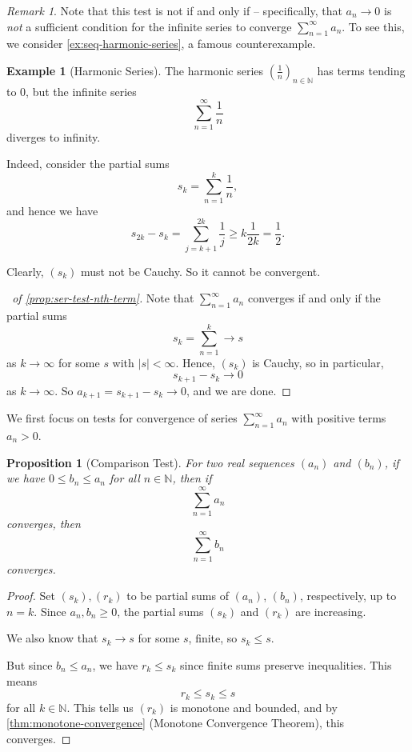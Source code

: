 \documentclass[11pt]{article}
\numberwithin{equation}{section}
\newtheorem{proposition}[theorem]{Proposition}
\theoremstyle{definition}
\newtheorem{example}[theorem]{Example}
\theoremstyle{remark}
\newtheorem{remark}[theorem]{Remark}
\newcommand{\pqty}[1]{\left(#1\right)}
\newcommand{\abs}[1]{\left|#1\right|}
\newcommand{\NN}{\mathbb N}
\begin{document}
\begin{remark}\label{analysis-unit-0036}
    Note that this test is not if and only if -- specifically, that \(a_n \to 0\) is \emph{not} a sufficient condition for the infinite series to converge \(\sum_{n = 1}^{\infty} a_n\). To see this, we consider \autoref{ex:seq-harmonic-series}, a famous counterexample.
\end{remark}

\begin{example}[Harmonic Series]\label{analysis-unit-0037}
    \label{ex:seq-harmonic-series}%
    The harmonic series \(\pqty{\frac{1}{n}}_{n \in \NN}\) has terms tending to \(0\), but the infinite series
    \[
        \sum_{n = 1}^{\infty} \frac{1}{n}
    \]
    diverges to infinity.

    Indeed, consider the partial sums
    \[
        s_k = \sum_{n = 1}^{k} \frac{1}{n},
    \]
    and hence we have
    \[
        s_{2k}-s_k=\sum_{j=k+1}^{2k}\frac1j\ge k\frac1{2k}=\frac12.
    \]

    Clearly, \(\pqty{s_k}\) must not be Cauchy. So it cannot be convergent.
\end{example}

\begin{proof}[\proofname\ of \autoref{prop:ser-test-nth-term}]
    Note that \(\sum_{n = 1}^{\infty} a_n\) converges if and only if the partial sums
    \[
        s_k = \sum_{n = 1}^{k} \to s
    \]
    as \(k \to \infty\) for some \(s\) with \(\abs{s} < \infty\). Hence, \(\pqty{s_k}\) is Cauchy, so in particular,
    \[
        s_{k + 1} - s_k \to 0
    \]
    as \(k \to \infty\). So \(a_{k + 1} = s_{k + 1} - s_k \to 0\), and we are done.
\end{proof}

We first focus on tests for convergence of series \(\sum_{n = 1}^{\infty} a_n\) with positive terms \(a_n > 0\).

\begin{proposition}[Comparison Test]\label{analysis-unit-0038}
    \label{prop:ser-test-comparison}%
    For two real sequences \(\pqty{a_n}\) and \(\pqty{b_n}\), if we have \(0 \leq b_n \leq a_n\) for all \(n \in \NN\), then if
    \[
        \sum_{n = 1}^{\infty} a_n
    \]
    converges, then
    \[
        \sum_{n = 1}^{\infty} b_n
    \]
    converges.
\end{proposition}

\begin{proof}
    Set \(\pqty{s_k}, \pqty{r_k}\) to be partial sums of \(\pqty{a_n}\), \(\pqty{b_n}\), respectively, up to \(n = k\). Since \(a_n, b_n \geq 0\), the partial sums \(\pqty{s_k}\) and \(\pqty{r_k}\) are increasing.

    We also know that \(s_k \to s\) for some \(s\), finite, so \(s_k \leq s\).

    But since \(b_n \leq a_n\), we have \(r_k \leq s_k\) since finite sums preserve inequalities. This means
    \[
        r_k \leq s_k \leq s
    \]
    for all \(k \in \NN\). This tells us \(\pqty{r_k}\) is monotone and bounded, and by \autoref{thm:monotone-convergence} (Monotone Convergence Theorem), this converges.
\end{proof}
\end{document}

